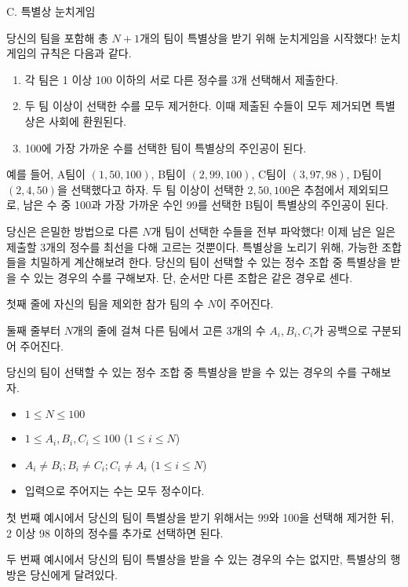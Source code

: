\def\probtitle{특별상 눈치게임}
\def\probno{C} %

\begin{problem}{\probno{}. \probtitle{}}

당신의 팀을 포함해 총 $N+1$개의 팀이 특별상을 받기 위해 눈치게임을 시작했다! 눈치게임의 규칙은 다음과 같다.

\begin{enumerate}[topsep=0pt,noitemsep]
    \item 각 팀은 1 이상 100 이하의 서로 다른 정수를 3개 선택해서 제출한다.
    \item 두 팀 이상이 선택한 수를 모두 제거한다. 이때 제출된 수들이 모두 제거되면 특별상은 사회에 환원된다.
    \item 100에 가장 가까운 수를 선택한 팀이 특별상의 주인공이 된다.
\end{enumerate}

예를 들어, A팀이 $(1, 50, 100)$, B팀이 $(2, 99, 100)$, C팀이 $(3, 97, 98)$, D팀이 $(2, 4, 50)$을 선택했다고 하자. 두 팀 이상이 선택한 $2, 50, 100$은 추첨에서 제외되므로, 남은 수 중 100과 가장 가까운 수인 99를 선택한 B팀이 특별상의 주인공이 된다.

당신은 은밀한 방법으로 다른 $N$개 팀이 선택한 수들을 전부 파악했다! 이제 남은 일은 제출할 3개의 정수를 최선을 다해 고르는 것뿐이다. 특별상을 노리기 위해, 가능한 조합들을 치밀하게 계산해보려 한다. 당신의 팀이 선택할 수 있는 정수 조합 중 특별상을 받을 수 있는 경우의 수를 구해보자. 단, 순서만 다른 조합은 같은 경우로 센다.

\InputFile
첫째 줄에 자신의 팀을 제외한 참가 팀의 수 $N$이 주어진다.

둘째 줄부터 $N$개의 줄에 걸쳐 다른 팀에서 고른 3개의 수 $A_i, B_i, C_i$가 공백으로 구분되어 주어진다.

\OutputFile
당신의 팀이 선택할 수 있는 정수 조합 중 특별상을 받을 수 있는 경우의 수를 구해보자.

\Constraints

\begin{itemize}[topsep=0pt,noitemsep]
    \item $1 \leq N \leq 100$
    \item $1 \le A_i, B_i, C_i \le 100$ ($1 \le i \le N$)
    \item $A_i \ne B_i; B_i \ne C_i; C_i \ne A_i$ ($1 \le i \le N$)
    \item 입력으로 주어지는 수는 모두 정수이다.
\end{itemize}

\Examples

\begin{example}
%
%
%
\end{example}

\Note
첫 번째 예시에서 당신의 팀이 특별상을 받기 위해서는 99와 100을 선택해 제거한 뒤, 2 이상 98 이하의 정수를 추가로 선택하면 된다.

두 번째 예시에서 당신의 팀이 특별상을 받을 수 있는 경우의 수는 없지만, 특별상의 행방은 당신에게 달려있다.
\end{problem}
